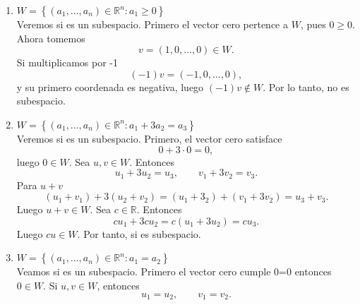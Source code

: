 \documentclass[12pt,a4paper]{article}
\begin{document}
    \begin{solucion}
        \begin{enumerate}
            \item[(a)] $W=\left\{(a_{1},\dots,a_{n})\in\mathbb{R}^{n}:a_{1}\geq0\right\}$\\
            Veremos si es un subespacio. Primero el vector cero pertence a $W$, pues $0\geq0$.
            Ahora tomemos
            \begin{equation*}
                v=(1,0,\dots,0)\in W.
            \end{equation*}
            Si multiplicamos por -1
            \begin{equation*}
                (-1)v=(-1,0,\dots,0),
            \end{equation*}
            y su primero coordenada es negativa, luego $(-1)v\notin W$. Por lo tanto, no es subespacio.
            \item[(b)] $W=\left\{(a_{1},\dots,a_{n})\in\mathbb{R}^{n}:a_{1}+3a_{2}=a_{3}\right\}$\\
            Veremos si es un subespacio. Primero, el vector cero satisface
            \begin{equation*}
                0+3\cdot0=0,
            \end{equation*}
            luego $0\in W$. Sea $u,v\in W$. Entonces
            \begin{equation*}
                u_{1}+3u_{2}=u_{3},\qquad v_{1}+3v_{2}=v_{3}.
            \end{equation*}
            Para $u+v$
            \begin{equation*}
                (u_{1}+v_{1})+3(u_{2}+v_{2})=(u_{1}+3_{2})+(v_{1}+3v_{2})=u_{3}+v_{3}.
            \end{equation*}
            Luego $u+v\in W$. Sea $c\in\mathbb{R}$. Entonces
            \begin{equation*}
                cu_{1}+3cu_{2}=c(u_{1}+3u_{2})=cu_{3}.
            \end{equation*}
            Luego $cu\in W$. Por tanto, si es subespacio.
            \item[(c)] $W=\left\{(a_{1},\dots,a_{n})\in\mathbb{R}^{n}:a_{1}=a_{2}\right\}$\\
            Veamos si es un subespacio. Primero el vector cero cumple 0=0 entonces $0\in W$.
            Si $u,v\in W$, entonces
            \begin{equation*}
                u_{1}=u_{2},\qquad v_{1}=v_{2}.
            \end{equation*}

\end{enumerate}
\end{solucion}
\end{document}
